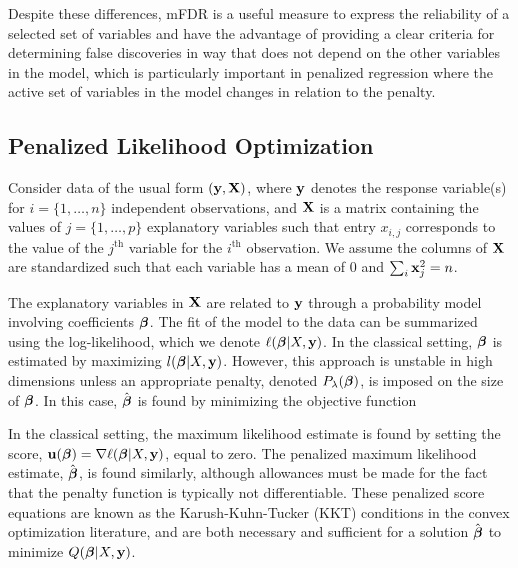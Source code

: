 Despite these differences, mFDR is a useful measure to express the reliability of a selected set of variables and have the advantage of providing a clear criteria for determining false discoveries in way that does not depend on the other variables in the model, which is particularly important in penalized regression where the active set of variables in the model changes in relation to the penalty.

\subsection{Penalized Likelihood Optimization}

Consider data of the usual form $(\mathbf{y}, \mathbf{X})$, where $\mathbf{y}$ denotes the response variable(s) for $i = \{1, \ldots, n\}$ independent observations, and $\mathbf{X}$ is a matrix containing the values of $j = \{1, \ldots, p\}$ explanatory variables such that entry $x_{i,j}$ corresponds to the value of the $j^{\textrm{th}}$ variable for the $i^{\textrm{th}}$ observation.  We assume the columns of $\mathbf{X}$ are standardized such that each variable has a mean of $0$ and $\sum_i \mathbf{x}_j^2 = n$.

The explanatory variables in $\mathbf{X}$ are related to $\mathbf{y}$ through a probability model involving coefficients $\boldsymbol{\beta}$.  The fit of the model to the data can be summarized using the log-likelihood, which we denote $\ell(\boldsymbol{\beta}|X,\mathbf{y})$.  In the classical setting, $\boldsymbol{\beta}$ is estimated by maximizing $l(\boldsymbol{\beta}|X,\mathbf{y})$.  However, this approach is unstable in high dimensions unless an appropriate penalty, denoted $P_{\lambda}(\boldsymbol{\beta})$, is imposed on the size of $\boldsymbol{\beta}$.
In this case, $\hat{\boldsymbol{\beta}}$ is found by minimizing the objective function


In the classical setting, the maximum likelihood estimate is found by setting the score, $\mathbf{u}(\boldsymbol{\beta}) = \nabla \ell(\boldsymbol{\beta}|X,\mathbf{y})$, equal to zero.  The penalized maximum likelihood estimate, $\hat{\boldsymbol{\beta}}$, is found similarly, although allowances must be made for the fact that the penalty function is typically not differentiable.  These penalized score equations are known as the Karush-Kuhn-Tucker (KKT) conditions in the convex optimization literature, and are both necessary and sufficient for a solution $\hat{\boldsymbol{\beta}}$ to minimize $Q(\boldsymbol{\beta}|X,\mathbf{y})$.

